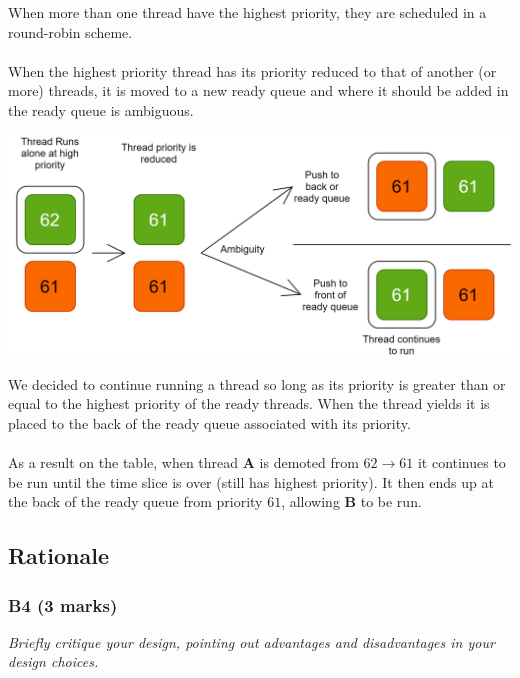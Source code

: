 \documentclass{report}
\newcommand{\question}[1]{\textit{#1} \\ }
\newcommand{\keyword}[1]{\textbf{#1}}
\begin{document}
                When more than one thread have the highest priority, they are scheduled in a round-robin scheme.
                \\
                \\ When the highest priority thread has its priority reduced to that of another (or more) threads, it is moved to a new ready queue and where it should be added in the ready queue is ambiguous.
                \begin{center}
                    \includegraphics[width=\textwidth]{ambiguity.png}
                \end{center}
                We decided to continue running a thread so long as its priority is greater than or equal to the highest priority of the ready threads. When the thread yields it is placed to the back of the ready queue associated with its priority.
                \\
                \\ As a result on the table, when thread \keyword{A} is demoted from $62 \to 61$ it continues to be run until the time slice is over (still has highest priority). It then ends up at the back of the ready queue from priority $61$, allowing \keyword{B} to be run.


        \subsection*{Rationale}

            \subsubsection*{B4  (3 marks)}
                \question{Briefly critique your design, pointing out advantages and disadvantages in your design choices.}
                
                
                
\end{document}
